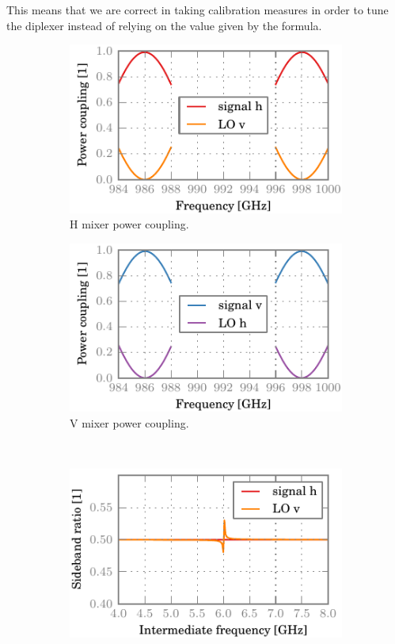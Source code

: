 This means that we are correct in taking calibration measures in order to tune the diplexer instead of relying on the value given by the formula.

\begin{figure}[hbtp]
    \centering
    \begin{subfigure}[b]{.5\textwidth}
        \includegraphics{chapter_3/0_ideal_h_dsb}%
        \caption{H mixer power coupling.}
    \end{subfigure}%
    \begin{subfigure}[b]{.5\textwidth}
        \includegraphics{chapter_3/0_ideal_v_dsb}%
        \caption{V mixer power coupling.}
    \end{subfigure}%
    \\
    \begin{subfigure}[b]{.5\textwidth}
        \includegraphics{chapter_3/0_ideal_h_sbr}%

\end{subfigure}
\end{figure}
